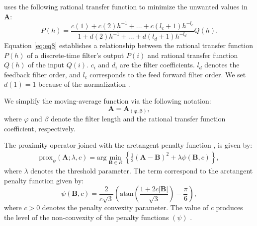  uses the following rational transfer function to minimize the unwanted values in ${\mathbf{{A}}}$:
\begin{equation}
{P(h)=\frac{c(1)+c(2)h^{-1}+...+c(l_c + 1)h^{-l_c}}{1+d(2)h^{-1} +...+ d(l_d+1)h^{-l_d}}}{Q(h)}.
\label{eq:eq8}
\end{equation}
Equation \ref{eq:eq8} establishes a relationship between the rational transfer function $P(h)$ of a discrete-time filter's output $P(i)$ and rational transfer function $Q(h)$ of the input $Q(i)$. ${c_i}$ and ${d_i}$ are the filter coefficients. $l_d$ denotes the feedback filter order, and $l_c$ corresponds to the feed forward filter order. We set $d(1) = 1$ because of the normalization \citep{schafer1989discrete}. 

We simplify the moving-average function via the following notation: 
\begin{equation}
\mathbf{A}=\mathbf{{A}_{(\varphi,\beta)}},   
\label{eq:eq9} 
\end{equation}
where $\varphi$ and $\beta$ denote the filter length and the rational transfer function coefficient, respectively.

The proximity operator joined with the arctangent penalty function \citep{selesnick2014sparse,parekh2017improved}, is given by:
\begin{align}
\textrm{prox}_{\psi}(\mathbf{A};\lambda,{c}) = \textrm{arg}\min_{\mathbf{B} \in R}\left\lbrace \frac{1}{2}\left(\mathbf{A}-\mathbf{B} \right) ^2 +\lambda\psi\left(\mathbf{B},{c} \right)\right\rbrace,
\label{eq:eq10}
\end{align}	
where $\lambda$ denotes the threshold parameter. The term  correspond to the arctangent penalty function \citep{selesnick2014sparse}  given by:
\begin{equation}
\psi\left(\mathbf{B},{c} \right)=\frac{2}{{c} \sqrt{3}}\left(\textrm{atan}\left( \dfrac{1+2{c} \left|\mathbf{B}\right|}{\sqrt{3}}\right) -\frac{\pi}{6}\right),
\label{eq:eq11}
\end{equation}	
where ${c}>0 $ denotes the penalty convexity parameter. The value of ${c}$ produces the level of the non-convexity of the penalty functions $ \left(\psi\right) $ \citep{parekh2017improved}.

